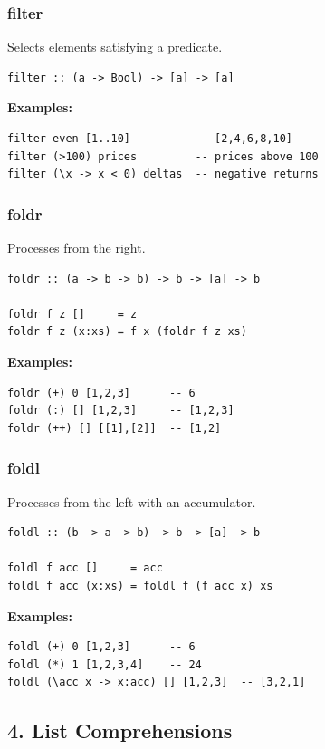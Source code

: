 \documentclass[12pt]{article}
\begin{document}
\subsubsection{filter}

Selects elements satisfying a predicate.

\begin{verbatim}
filter :: (a -> Bool) -> [a] -> [a]
\end{verbatim}

\textbf{Examples:}
\begin{verbatim}
filter even [1..10]          -- [2,4,6,8,10]
filter (>100) prices         -- prices above 100
filter (\x -> x < 0) deltas  -- negative returns
\end{verbatim}

\subsubsection{foldr}

Processes from the right.

\begin{verbatim}
foldr :: (a -> b -> b) -> b -> [a] -> b

foldr f z []     = z
foldr f z (x:xs) = f x (foldr f z xs)
\end{verbatim}

\textbf{Examples:}
\begin{verbatim}
foldr (+) 0 [1,2,3]      -- 6
foldr (:) [] [1,2,3]     -- [1,2,3]
foldr (++) [] [[1],[2]]  -- [1,2]
\end{verbatim}

\subsubsection{foldl}

Processes from the left with an accumulator.

\begin{verbatim}
foldl :: (b -> a -> b) -> b -> [a] -> b

foldl f acc []     = acc
foldl f acc (x:xs) = foldl f (f acc x) xs
\end{verbatim}

\textbf{Examples:}
\begin{verbatim}
foldl (+) 0 [1,2,3]      -- 6
foldl (*) 1 [1,2,3,4]    -- 24
foldl (\acc x -> x:acc) [] [1,2,3]  -- [3,2,1]
\end{verbatim}

\subsection{4. List Comprehensions}
\end{document}
